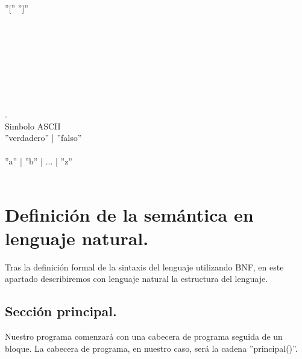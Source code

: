 \documentclass[12pt, spanish]{article}
\begin{document}
\begin{bnf*}
    \\
    {''[''  '']''}\\
    { \bnfsp {}}\\
	 \\
    \bnfmore{| \bnfsp \epsilon}\\
  	 { \bnfsp {}}\\
	 \\
	 \bnfmore{| \epsilon}\\
    { }\\
    \\
		{.}\\
        {Simbolo ASCII}\\
		{ ''verdadero'' | ''falso'' }\\
		{}\\
		{''a'' \bnfsp | \bnfsp ''b'' \bnfsp | \bnfsp ... \bnfsp | \bnfsp ''z''}\\
		\\
\end{bnf*}


\section{Definición de la semántica en lenguaje natural.}

Tras la definición formal de la sintaxis del lenguaje utilizando BNF, en este apartado describiremos con lenguaje natural la estructura del lenguaje.


\subsection{Sección principal.}

Nuestro programa comenzará con una cabecera de programa seguida de un bloque. La cabecera de programa, en nuestro caso, será la cadena ''principal()''.
\end{document}
